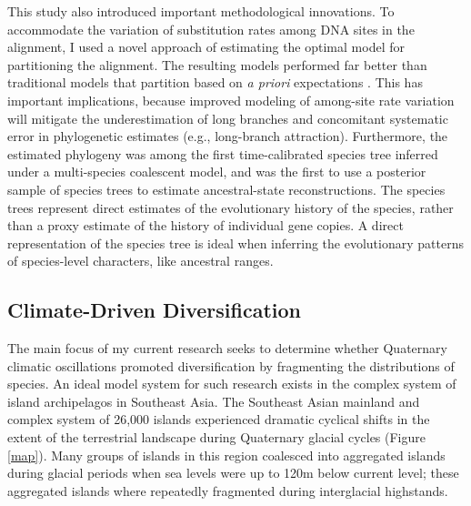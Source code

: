 \documentclass[10pt]{article}
\begin{document}
This study also introduced important methodological innovations.
To accommodate the variation of substitution rates among DNA sites in the alignment, I used a novel approach of estimating the optimal model for partitioning the alignment.
The resulting models performed far better than traditional models that partition based on \emph{a priori} expectations \cite{OaksInPrep}.
This has important implications, because improved modeling of among-site rate variation will mitigate the underestimation of long branches and concomitant systematic error in phylogenetic estimates (e.g., long-branch attraction).
Furthermore, the estimated phylogeny was among the first time-calibrated species tree inferred under a multi-species coalescent model, and was the first to use a posterior sample of species trees to estimate ancestral-state reconstructions.
The species trees represent direct estimates of the evolutionary history of the species, rather than a proxy estimate of the history of individual gene copies.
A direct representation of the species tree is ideal when inferring the evolutionary patterns of species-level characters, like ancestral ranges.

\subsection*{Climate-Driven Diversification}
The main focus of my current research seeks to determine whether Quaternary climatic oscillations promoted diversification by fragmenting the distributions of species.
An ideal model system for such research exists in the complex system of island archipelagos in Southeast Asia.
The Southeast Asian mainland and complex system of 26,000\+ islands experienced dramatic cyclical shifts in the extent of the terrestrial landscape during Quaternary glacial cycles (Figure \ref{map}).
Many groups of islands in this region coalesced into aggregated islands during glacial periods when sea levels were up to 120m below current level; these aggregated islands where repeatedly fragmented during interglacial highstands.
\end{document}
